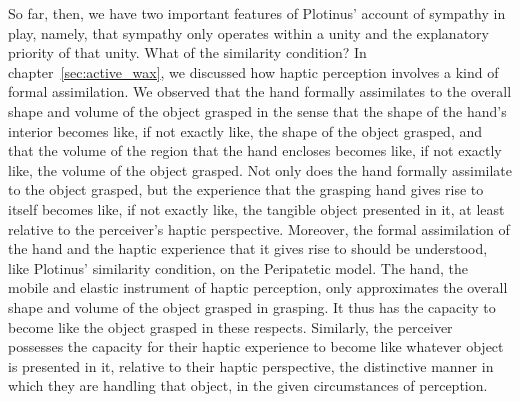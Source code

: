 So far, then, we have two important features of Plotinus' account of sympathy in play, namely, that sympathy only operates within a unity and the explanatory priority of that unity. What of the similarity condition? In chapter~\ref{sec:active_wax}, we discussed how haptic perception involves a kind of formal assimilation. We observed that the hand formally assimilates to the overall shape and volume of the object grasped in the sense that the shape of the hand's interior becomes like, if not exactly like, the shape of the object grasped, and that the volume of the region that the hand encloses becomes like, if not exactly like, the volume of the object grasped. Not only does the hand formally assimilate to the object grasped, but the experience that the grasping hand gives rise to itself becomes like, if not exactly like, the tangible object presented in it, at least relative to the perceiver's haptic perspective. Moreover, the formal assimilation of the hand and the haptic experience that it gives rise to should be understood, like Plotinus' similarity condition, on the Peripatetic model. The hand, the mobile and elastic instrument of haptic perception, only approximates the overall shape and volume of the object grasped in grasping. It thus has the capacity to become like the object grasped in these respects. Similarly, the perceiver possesses the capacity for their haptic experience to become like whatever object is presented in it, relative to their haptic perspective, the distinctive manner in which they are handling that object, in the given circumstances of perception. 

